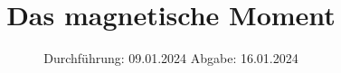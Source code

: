 

\subject{v105}
\title{Das magnetische Moment}
\date{%
  Durchführung: 09.01.2024
  \hspace{3em}
  Abgabe: 16.01.2024
}



\maketitle
\thispagestyle{empty}
\tableofcontents
\newpage






\printbibliography{}

